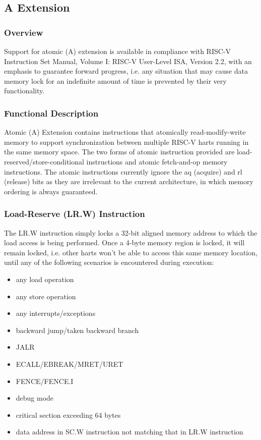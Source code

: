 \documentclass[main\_\_EN.tex]{subfiles}
\begin{document}
\newpage
\subsection{A Extension}
\label{sec:riscvcpu-atomic}

\subsubsection{Overview}
\label{sec:riscvcpu-atomic-overview}

Support for atomic (A) extension is available in compliance with RISC-V Instruction Set Manual, Volume I: RISC-V User-Level ISA, Version 2.2, with an emphasis to guarantee forward progress, i.e. any situation that may cause data memory lock for an indefinite amount of time is prevented by their very functionality.

\subsubsection{Functional Description}
\label{sec:riscvcpu-atomic-func-descr}

Atomic (A) Extension contains instructions that atomically read-modify-write memory to support synchronization between multiple RISC-V harts running in the same memory space. The two forms of atomic instruction provided are load-reserved/store-conditional instructions and atomic fetch-and-op memory instructions. The atomic instructions currently ignore the aq (acquire) and rl (release) bits as they are irrelevant to the current architecture, in which memory ordering is always guaranteed.

\subsubsection{Load-Reserve (LR.W) Instruction}
\label{sec:riscvcpu-atomic-lr}

The LR.W instruction simply locks a 32-bit aligned memory address to which the load access is being performed. Once a 4-byte memory region is locked, it will remain locked, i.e. other harts won't be able to access this same memory location, until any of the following scenarios is encountered during execution:

\begin{itemize}
    \item any load operation
    \item any store operation
    \item any interrupts/exceptions
    \item backward jump/taken backward branch
    \item JALR
    \item ECALL/EBREAK/MRET/URET
    \item FENCE/FENCE.I
    \item debug mode
    \item critical section exceeding 64 bytes
    \item data address in SC.W instruction not matching that in LR.W instruction
\end{itemize}
\end{document}

